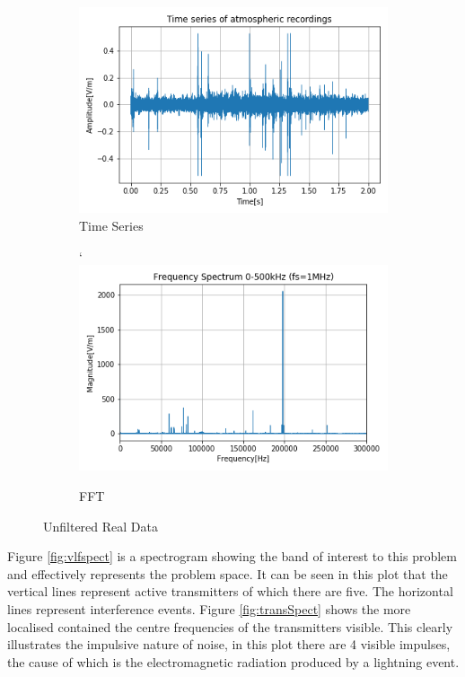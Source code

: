 \begin{figure}[h!]
    \begin{subfigure}[b]{0.5\textwidth}
        \centering
        \includegraphics[width = \textwidth]{figs/sig_character/timeseries.png}
        \caption{Time Series}
        \label{fig:realData}
    \end{subfigure}
    \begin{subfigure}[b]{0.5\textwidth}
    `   \centering
        \includegraphics[width = \textwidth]{figs/sig_character/fft_data.png}
        \caption{FFT}
        \label{fig:realFFT}
    \end{subfigure}
    \caption{Unfiltered Real Data}
\end{figure}



Figure \ref{fig:vlfspect} is a spectrogram showing the band of interest to this problem and effectively represents the problem space. It can be seen in this plot that the vertical lines represent active transmitters of which there are five. The horizontal lines represent interference events. Figure \ref{fig:transSpect} shows the more localised contained the centre frequencies of the transmitters visible. This clearly illustrates the impulsive nature of noise, in this plot there are 4 visible impulses, the cause of which is the electromagnetic radiation produced by a lightning event. 

